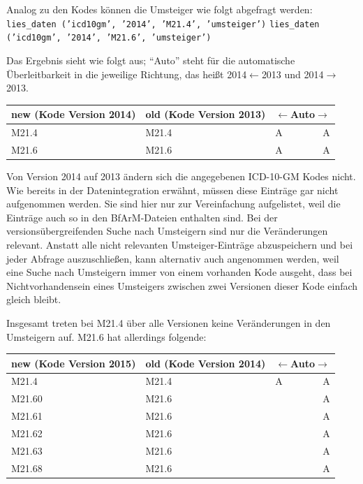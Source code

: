 Analog zu den Kodes können die Umsteiger wie folgt abgefragt werden: \newline
\texttt{lies\_daten ('icd10gm', '2014', 'M21.4', 'umsteiger')} \newline
\texttt{lies\_daten ('icd10gm', '2014', 'M21.6', 'umsteiger')}

Das Ergebnis sieht wie folgt aus; ``Auto'' steht für die automatische Überleitbarkeit in die jeweilige Richtung, das heißt 2014$\leftarrow$2013 und 2014$\rightarrow$2013.

\begin{centernss}
\renewcommand{\arraystretch}{1.2}
\begin{tabular}{p{136pt}p{136pt}lr}
new (Kode Version 2014) & old (Kode Version 2013) & \multicolumn{2}{c}{$\leftarrow$Auto$\rightarrow$} \\
\hline
M21.4 & M21.4 & A & A \\
M21.6 & M21.6 & A & A \\
\end{tabular}
\end{centernss}

Von Version 2014 auf 2013 ändern sich die angegebenen ICD-10-GM Kodes nicht. Wie bereits in der Datenintegration erwähnt, müssen diese Einträge gar nicht aufgenommen werden. Sie sind hier nur zur Vereinfachung aufgelistet, weil die Einträge auch so in den BfArM-Dateien enthalten sind. Bei der versionsübergreifenden Suche nach Umsteigern sind nur die Veränderungen relevant. Anstatt alle nicht relevanten Umsteiger-Einträge abzuspeichern und bei jeder Abfrage auszuschließen, kann alternativ auch angenommen werden, weil eine Suche nach Umsteigern immer von einem vorhanden Kode ausgeht, dass bei Nichtvorhandensein eines Umsteigers zwischen zwei Versionen dieser Kode einfach gleich bleibt.

Insgesamt treten bei M21.4 über alle Versionen keine Veränderungen in den Umsteigern auf. M21.6 hat allerdings folgende:

\begin{centernss}
\renewcommand{\arraystretch}{1.2}
\begin{tabular}{p{136pt}p{136pt}lr}
new (Kode Version 2015) & old (Kode Version 2014) & \multicolumn{2}{c}{$\leftarrow$Auto$\rightarrow$} \\
\hline
M21.4 & M21.4 & A & A \\
M21.60 & M21.6 & & A \\
M21.61 & M21.6 & & A \\
M21.62 & M21.6 & & A \\
M21.63 & M21.6 & & A \\
M21.68 & M21.6 & & A \\
\end{tabular}
\end{centernss}

